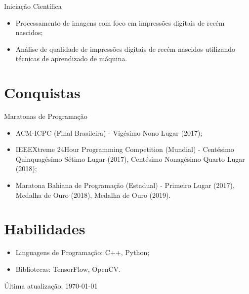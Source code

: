 \documentclass[letterpaper]{article}
\def\footerlink{}
\begin{document}
  Iniciação Científica
  \begin{itemize}
    \item Processamento de imagens com foco em impressões digitais de recém nascidos;
    \item Análise de qualidade de impressões digitais de recém nascidos utilizando técnicas de aprendizado de máquina.
  \end{itemize}


\section*{Conquistas}

Maratonas de Programação

\begin{itemize}
  \item ACM-ICPC (Final Brasileira) - Vigésimo Nono Lugar (2017);
  \item IEEEXtreme 24Hour Programming Competition (Mundial) - Centésimo Quinquagésimo Sétimo Lugar (2017), Centésimo Nonagésimo Quarto Lugar (2018);
  \item Maratona Bahiana de Programação (Estadual) - Primeiro Lugar (2017), Medalha de Ouro (2018), Medalha de Ouro (2019).
\end{itemize}

\section*{Habilidades}
\begin{itemize}
  \item Linguagens de Programação: C++, Python;
  \item Bibliotecas: TensorFlow, OpenCV.
\end{itemize}

\bigskip

\begin{center}
  \begin{footnotesize}
    Última atualização: \today \\
    \href{\footerlink}{\texttt{\footerlink}}
  \end{footnotesize}
\end{center}
\end{document}

